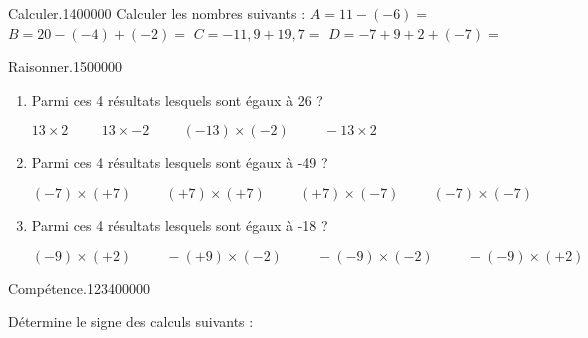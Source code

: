 \begin{pageAD}  %
\restoregeometry %


\begin{ExoCad}{Calculer.}{14}{0}{0}{0}{0}{0}
Calculer les nombres suivants :
$A = 11 - (-6) = $ 
$B = 20 - (-4) + (-2) = $ 
$C = - 11,9 + 19,7 = $ 
$D = -7 +9+2+(-7)= $ 
\end{ExoCad}

 

\begin{ExoCad}{Raisonner.}{15}{0}{0}{0}{0}{0}
\begin{enumerate}
\item Parmi ces 4 résultats lesquels sont égaux à 26 ?

$13 \times 2 \hspace{1cm} 13 \times -2 \hspace{1cm}(-13) \times (-2) \hspace{1cm} -13 \times 2 $ 

\item Parmi ces 4 résultats lesquels sont égaux à -49 ?

$(-7) \times (+7) \hspace{1cm} (+7) \times (+7) \hspace{1cm}(+7) \times (-7) \hspace{1cm} (-7) \times (-7) $ 

\item Parmi ces 4 résultats lesquels sont égaux à -18 ?

$(-9) \times (+2) \hspace{1cm} -(+9) \times (-2) \hspace{1cm}-(-9) \times (-2) \hspace{1cm} -(-9) \times (+2) $ 
\end{enumerate}
\end{ExoCad}

 

\begin{ExoCad}{Compétence.}{1234}{0}{0}{0}{0}{0}

Détermine le signe des calculs suivants :

\end{ExoCad}
 
\end{pageAD} %

